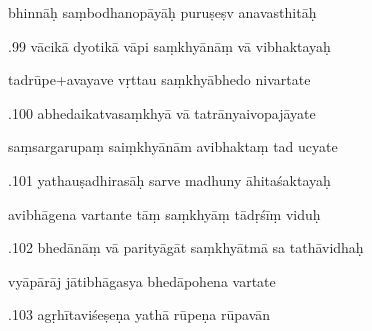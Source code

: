 \documentclass[article,12pt,a4paper]{memoir}%
\newcounter{parCount}
\begin{document}
	  
	  \pstart \leavevmode%
	bhinnāḥ saṃbodhanopāyāḥ puruṣeṣv anavasthitāḥ 
	{}
	\pend%
      

	  
	  \pstart {}.99 vācikā dyotikā vāpi saṃkhyānāṃ vā vibhaktayaḥ 
	{}
	\pend%
      

	  
	  \pstart \leavevmode%
	tadrūpe+avayave vṛttau saṃkhyābhedo nivartate 
	{}
	\pend%
      

	  
	  \pstart {}.100 abhedaikatvasaṃkhyā vā tatrānyaivopajāyate 
	{}
	\pend%
      

	  
	  \pstart \leavevmode%
	saṃsargarupaṃ saiṃkhyānām avibhaktaṃ tad ucyate 
	{}
	\pend%
      

	  
	  \pstart {}.101 yathauṣadhirasāḥ sarve madhuny āhitaśaktayaḥ 
	{}
	\pend%
      

	  
	  \pstart \leavevmode%
	avibhāgena vartante tāṃ saṃkhyāṃ tādṛśīṃ viduḥ 
	{}
	\pend%
      

	  
	  \pstart {}.102 bhedānāṃ vā parityāgāt saṃkhyātmā sa tathāvidhaḥ 
	{}
	\pend%
      

	  
	  \pstart \leavevmode%
	vyāpārāj jātibhāgasya bhedāpohena vartate 
	{}
	\pend%
      

	  
	  \pstart {}.103 agṛhītaviśeṣeṇa yathā rūpeṇa rūpavān 
	{}
	\pend%
      
\end{document}
